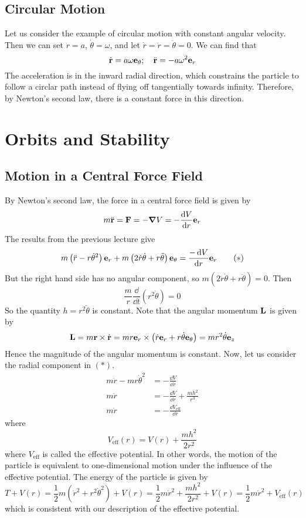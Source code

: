 \documentclass{article}
\begin{document}
\subsection{Circular Motion}
Let us consider the example of circular motion with constant angular velocity. Then we can set $r = a$, $\dot\theta = \omega$, and let $\dot r = \ddot r = \ddot \theta = 0$. We can find that
\[ \dot {\vb r} = a \omega \vb e_\theta ;\quad \ddot{\vb r} = -a\omega^2 \vb e_r \]
The acceleration is in the inward radial direction, which constrains the particle to follow a circlar path instead of flying off tangentially towards infinity. Therefore, by Newton's second law, there is a constant force in this direction.

\section{Orbits and Stability}
\subsection{Motion in a Central Force Field}
By Newton's second law, the force in a central force field is given by
\[ m\ddot{\vb r} = \vb F = -\grad V = -\frac{\dd{V}}{\dd{r}} \vb e_r \]
The results from the previous lecture give
\begin{equation}
    m\left(\ddot r - r\dot\theta^2\right) \vb e_r + m\left(2\dot r \dot \theta + r \ddot \theta\right) \vb e_\theta = \frac{-\dd{V}}{\dd{r}} \vb e_r \tag{$\ast$}
\end{equation}
But the right hand side has no angular component, so $m\left(2\dot r \dot \theta + r \ddot \theta\right) = 0$. Then
\[ \frac{m}{r} \frac{\dd}{\dd{t}}\left(r^2 \dot\theta\right) = 0 \]
So the quantity $h = r^2 \dot\theta$ is constant. Note that the angular momentum $\vb L$ is given by
\[ \vb L = m\vb r \times \dot{\vb r} = mr\vb e_r \times \left( \dot r\vb e_r + r\dot\theta \vb e_\theta \right) = mr^2 \dot\theta \vb e_z \]
Hence the magnitude of the angular momentum is constant. Now, let us consider the radial component in $(\ast)$.
\begin{align*}
    m\ddot r - mr\dot\theta^2 & = -\frac{\dd{V}}{\dd{r}}                    \\
    m\ddot r                  & = -\frac{\dd{V}}{\dd{r}} + \frac{mh^2}{r^3} \\
    m\ddot r                  & = -\frac{\dd{V}_\text{eff}}{\dd{r}}
\end{align*}
where
\[ V_\text{eff}(r) = V(r) + \frac{mh^2}{2r^2} \]
where $V_\text{eff}$ is called the effective potential. In other words, the motion of the particle is equivalent to one-dimensional motion under the influence of the effective potential. The energy of the particle is given by
\[ T + V(r) = \frac{1}{2}m\left( \dot r^2 + r^2 \dot\theta^2 \right) + V(r) = \frac{1}{2}m\dot r^2 + \frac{mh^2}{2r^2} + V(r) = \frac{1}{2}m\dot r^2 + V_\text{eff}(r) \]
which is consistent with our description of the effective potential.
\end{document}
